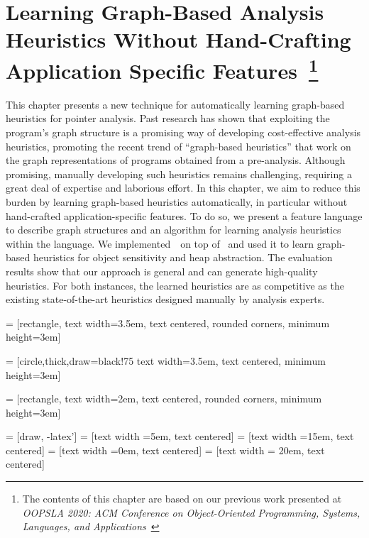 \chapter{Learning Graph-Based Analysis Heuristics Without Hand-Crafting Application Specific Features~\footnote{The contents of this chapter are based on our previous work presented at \emph{OOPSLA 2020: ACM Conference on Object-Oriented Programming, Systems, Languages, and Applications}~\cite{Graphick20}}}\label{sec:Graphick}


This chapter presents a new technique for automatically learning graph-based heuristics for pointer analysis.
Past research has shown that exploiting the program's graph structure is a promising way of developing cost-effective analysis heuristics, promoting the recent trend of ``graph-based heuristics'' that work on the graph representations of programs obtained from a  pre-analysis. 
Although promising, manually developing such heuristics remains challenging, requiring a great deal of expertise and laborious effort.
In this chapter, we aim to reduce this burden by learning graph-based heuristics automatically, in particular without hand-crafted application-specific features. To do so, we present a feature language to describe graph structures and an algorithm for learning analysis heuristics within the language.
We implemented~\ourtool~on top of \Doop~and used it to learn graph-based heuristics for object sensitivity and heap abstraction.
The evaluation results show that our approach is general and can generate high-quality heuristics. For both instances,
the learned heuristics are as competitive as the existing state-of-the-art heuristics designed manually by analysis experts.







 = [rectangle,   text width=3.5em, text
centered, rounded corners, minimum height=3em]



 = [circle,thick,draw=black!75   text width=3.5em, text
centered, minimum height=3em]


 = [rectangle,   text width=2em, text
centered, rounded corners, minimum height=3em]

 = [draw, -latex']
 = [text width =5em, text centered]
 = [text width =15em, text centered]
 = [text width =0em, text centered]
 = [text width = 20em, text centered]

